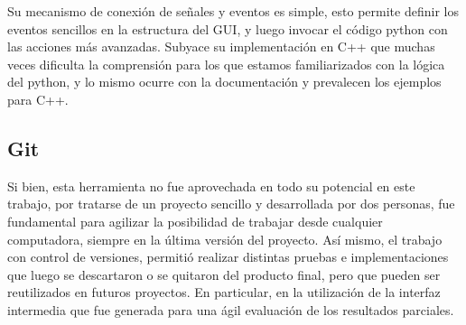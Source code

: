 Su mecanismo de conexión de señales y eventos es simple, esto permite definir los eventos sencillos en la estructura del GUI, y luego invocar el c\'odigo python con las acciones m\'as avanzadas. Subyace su implementaci\'on en C++ que muchas veces dificulta la comprensi\'on para los que estamos familiarizados con la l\'ogica del python, y lo mismo ocurre con la documentaci\'on y prevalecen los ejemplos para C++.\\

\subsection*{Git}
Si bien, esta herramienta no fue aprovechada en todo su potencial en este trabajo, por tratarse de un proyecto sencillo y desarrollada por dos personas, fue fundamental para agilizar la posibilidad de trabajar desde cualquier computadora, siempre en la \'ultima versi\'on del proyecto.
As\'i mismo, el trabajo con control de versiones, permiti\'o realizar distintas pruebas e implementaciones que luego se descartaron o se quitaron del producto final, pero que pueden ser reutilizados en futuros proyectos. En particular, en la utilizaci\'on de la interfaz intermedia que fue generada para una \'agil evaluaci\'on de los resultados parciales.\\









